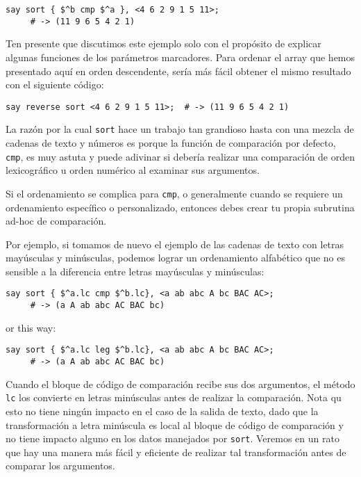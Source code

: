 \begin{lstlisting}
say sort { $^b cmp $^a }, <4 6 2 9 1 5 11>;
     # -> (11 9 6 5 4 2 1)
\end{lstlisting}

Ten presente que discutimos este ejemplo solo con el
propósito de explicar algunas funciones de los 
parámetros marcadores. Para ordenar el array que hemos
presentado aquí en orden descendente, sería más fácil 
obtener el mismo resultado con el siguiente código:

\begin{lstlisting}
say reverse sort <4 6 2 9 1 5 11>;  # -> (11 9 6 5 4 2 1)
\end{lstlisting}

La razón por la cual {\tt sort} hace un trabajo tan grandioso
hasta con una mezcla de cadenas de texto y números es porque 
la función de comparación por defecto, {\tt cmp}, es muy astuta 
y puede adivinar si debería realizar una comparación de orden
lexicográfico u orden numérico al examinar sus argumentos.

Si el ordenamiento se complica para {\tt cmp}, o generalmente
cuando se requiere un ordenamiento específico o personalizado,
entonces debes crear tu propia subrutina ad-hoc de comparación.

Por ejemplo, si tomamos de nuevo el ejemplo de las cadenas
de texto con letras mayúsculas y minúsculas, podemos lograr un
ordenamiento alfabético que no es sensible a la diferencia
entre letras mayúsculas y minúsculas:

\begin{lstlisting}
say sort { $^a.lc cmp $^b.lc}, <a ab abc A bc BAC AC>;
     # -> (a A ab abc AC BAC bc)
\end{lstlisting}

or this way:
\begin{lstlisting}
say sort { $^a.lc leg $^b.lc}, <a ab abc A bc BAC AC>;
     # -> (a A ab abc AC BAC bc)
\end{lstlisting}

Cuando el bloque de código de comparación recibe sus dos 
argumentos, el método {\tt lc} los convierte en letras
minúsculas antes de realizar la comparación. Nota qu esto
no tiene ningún impacto en el caso de la salida de texto,
dado que la transformación a letra minúscula es local
al bloque de código de comparación y no tiene impacto
alguno en los datos manejados por {\tt sort}. Veremos
en un rato que hay una manera más fácil y eficiente de
realizar tal transformación antes de comparar los argumentos.

